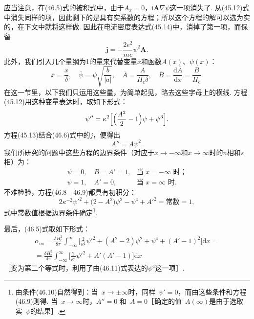应当注意，在(46.5)式的被积式中，由于$A_x=0$，$\mathrm{i}\bm{A}\nabla\psi$这一项消失了. 从(45.12)式中消失同样的项，因此剩下的是具有实系数的方程；所以这个方程的解可以选为实的，在下文中就将这样做. 因此在电流密度表达式(45.14)中，消掉了第一项，而保留
\begin{equation}
\bm{j}=-\frac{2e^2}{mc}\psi^2\bm{A}.
\end{equation}
此外，我们引入几个量纲为1的量来代替变量$x$和函数$A(x)$、$\psi(x)$：
\begin{equation}
\bar{x}=\frac{x}{\delta},\quad
\bar{\psi}=\psi\sqrt{\frac{b}{|a|}},\quad
\overline{A}=\frac{A}{H_{\mathrm{c}}\delta},\quad
\overline{B}=\frac{\mathrm{d}\overline{A}}{\mathrm{d}\bar{x}}=\frac{B}{H_{\mathrm{c}}}.
\end{equation}
在这一节里，以下我们只运用这些量，为简单起见，略去这些字母上的横线. 方程(45.12)用这种变量表达时，取如下形式：
\begin{equation}
\psi''=\kappa^2\Bigl[\Bigl(\frac{A^2}{2}-1\Bigr)\psi+\psi^3\Bigr].
\end{equation}
方程(45.13)结合(46.6)式中的$j$，便得出
\begin{equation}
A''=A\psi^2.
\end{equation}
我们所研究的问题中这些方程的边界条件（对应于$x\to-\infty$和$x\to\infty$时的$n$相和$s$相）为：
\begin{equation}
\begin{array}{ll}
\psi=0,\quad B=A'=1,&\text{当 }x=-\infty\text{ 时；}\\[0.2em]
\psi=1,\quad A'=0,&\text{当 }x=\infty\text{ 时.}
\end{array}
\end{equation}
不难检验，方程(46.8—46.9)都具有初积分：
\begin{equation}
2\kappa^{-2}\psi'^2+\bigl(2-A^2\bigr)\psi^2-\psi^4+A'^2=\text{常数}=1,
\end{equation}
式中常数值根据边界条件确定\footnote{由条件(46.10)自然得到：当~$x\to\pm\infty$时，同样~$\psi'=0$，而由这些条件和方程(46.9)则得. 当~$x\to\infty$时，$A''=0$ 和~$A=0$［确定的值~$A(\infty)$是由于选取实~$\psi$的结果］.}.

最后，(46.5)式取如下形式：
\begin{equation}
\begin{aligned}
\alpha_{ns}=\frac{\delta H_{\mathrm{c}}^2}{8\pi}\int_{-\infty}^{\infty}
\biggl[\frac{2}{\kappa^2}\psi'^2+(A^2-2)\psi^2+\psi^4+(A'-1)^2\biggr]\mathrm{d}x={}\\
{}=\frac{\delta H_{\mathrm{c}}^2}{4\pi}\int_{-\infty}^{\infty}
\biggl[\frac{2}{\kappa^2}\psi'^2+A'(A'-1)\biggr]\mathrm{d}x
\end{aligned}
\end{equation}
［变为第二个等式时，利用了由(46.11)式表达的$\psi^4$这一项］.

